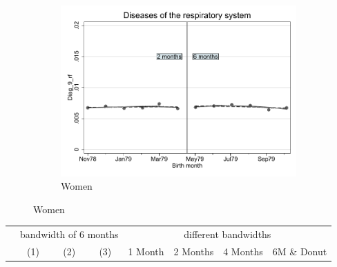 \documentclass[a4paper ]{article}
\begin{document}
\begin{figure}[h]
\begin{subfigure}[t]{0.31\textwidth}
		\centering
		\includegraphics[width=0.99\textwidth]{R1_RD_Diag_9_rf_fits}
		\caption{Women}
	\end{subfigure}
\end{figure}


\begin{table}[h]\centering
\def\sym#1{\ifmmode^{#1}\else\(^{#1}\)\fi}
\begin{tabular}{l*{3}{c}|cccc}
\toprule
&\multicolumn{3}{c}{bandwidth of 6 months} & \multicolumn{4}{c}{different bandwidths} \\
 \cmidrule(lr{1em}){2-4} \cmidrule(lr{1em}){5-8}
 &\multicolumn{1}{c}{(1)}&\multicolumn{1}{c}{(2)}&\multicolumn{1}{c}{(3)}& 1 Month & 2 Months & 4 Months & 6M \& Donut \\
\midrule 

\bottomrule
\end{tabular}
\end{table}
\end{document}
